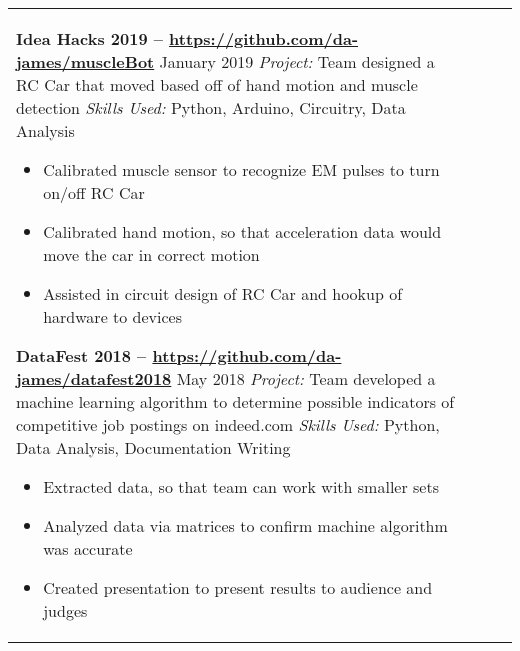 \documentclass[10pt]{article}
\newcommand*\leftright[2]{%
  \leavevmode
  \rlap{#1}%
  \hspace{0.5\linewidth}%
  #2}
\begin{document}
\begin{longtable}{l l l l}
{        \textbf{Idea Hacks 2019 -- \href{https://github.com/da-james/muscleBot}{https://github.com/da-james/muscleBot}} \newline
        \leftright{\textit{Title:} Data Analyst}{January 2019} \newline
        \textit{Project:} Team designed a RC Car that moved based off of hand motion and muscle detection \newline
        \textit{Skills Used:} Python, Arduino, Circuitry, Data Analysis
        \begin{itemize}[noitemsep,nolistsep]
            \item Calibrated muscle sensor to recognize EM pulses to turn on/off RC Car
            \item Calibrated hand motion, so that acceleration data would move the car in correct motion
            \item Assisted in circuit design of RC Car and hookup of hardware to devices
        \end{itemize}
        
        \textbf{DataFest 2018 -- \href{https://github.com/da-james/datafest2018}{https://github.com/da-james/datafest2018}} \newline
        \leftright{\textit{Title:} Data Analyst}{May 2018}  \newline
        \textit{Project:} Team developed a machine learning algorithm to determine possible indicators of competitive job postings on indeed.com \newline
        \textit{Skills Used:} Python, Data Analysis, Documentation Writing
        \begin{itemize}[noitemsep,nolistsep]
            \item Extracted data, so that team can work with smaller sets
            \item Analyzed data via matrices to confirm machine algorithm was accurate
            \item Created presentation to present results to audience and judges
        \end{itemize}
        
}
\end{longtable}
\end{document}
